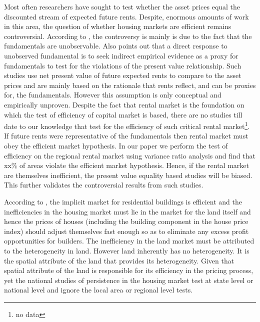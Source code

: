 \documentclass[AEJ,reqno, draftmode]{AEA}
\begin{document}
Most often researchers have sought to test whether the asset prices equal the discounted stream of expected future rents. Despite, enormous amounts of work in this area, the question of whether housing markets are efficient remains controversial. According to \cite{rosenthal1999residential}, the controversy is mainly is due to the fact that the fundamentals are unobservable. Also \citet{stiglitz1990symposium} points out that a direct response to unobserved fundamental is to seek indirect empirical evidence as a proxy for fundamentals to test for the violations of the present value relationship. Such studies use net present value of future expected rents to compare to the asset prices and are mainly based on the rationale that rents reflect, and can be proxies for, the fundamentals. However this assumption is only conceptual and empirically unproven. Despite the fact that rental market is the foundation on which the test of efficiency of capital market is based, there are no studies till date to our knowledge that test for the efficiency of such critical rental market\footnote{no data}. If future rents were representative of the fundamentals then rental market must obey the efficient market hypothesis. In our paper we perform the test of efficiency on the regional rental market using variance ratio analysis and find that xx\% of areas violate the efficient market hypothesis. Hence, if the rental market are themselves inefficient, the present value equality based studies will be biased. This further validates the controversial results from such studies.   


According to \citet{rosenthal1999residential}, the implicit market for residential buildings is efficient and the inefficiencies in the housing market must lie in the market for the land itself and hence the prices of houses (including the building component in the house price index) should adjust themselves fast enough so as to eliminate any excess profit opportunities for builders. The inefficiency in the land market must be attributed to the heterogeneity in land. However land inherently has no heterogeneity. It is the spatial attribute of the land that provides its heterogeneity. Given that spatial attribute of the land is responsible for its efficiency in the pricing process, yet the national studies of persistence in the housing market test at state level or national level and ignore the local area or regional level tests.


\end{document}
